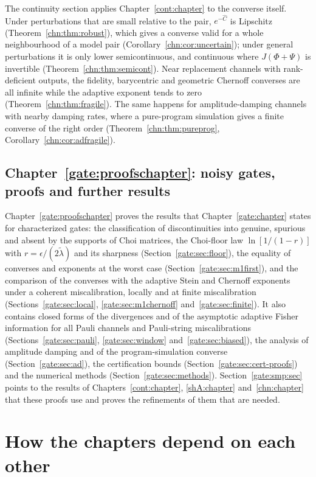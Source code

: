 The continuity section applies Chapter~\ref{cont:chapter} to the converse itself. Under perturbations that are small relative to the pair, $e^{-\widehat C}$ is Lipschitz (Theorem~\ref{chn:thm:robust}), which gives a converse valid for a whole neighbourhood of a model pair (Corollary~\ref{chn:cor:uncertain}); under general perturbations it is only lower semicontinuous, and continuous where $J(\Phi+\Psi)$ is invertible (Theorem~\ref{chn:thm:semicont}). Near replacement channels with rank-deficient outputs, the fidelity, barycentric and geometric Chernoff converses are all infinite while the adaptive exponent tends to zero (Theorem~\ref{chn:thm:fragile}). The same happens for amplitude-damping channels with nearby damping rates, where a pure-program simulation gives a finite converse of the right order (Theorem~\ref{chn:thm:pureprog}, Corollary~\ref{chn:cor:adfragile}).

\subsection*{Chapter~\ref{gate:proofschapter}: noisy gates, proofs and further results}

Chapter~\ref{gate:proofschapter} proves the results that Chapter~\ref{gate:chapter} states for characterized gates: the classification of discontinuities into genuine, spurious and absent by the supports of Choi matrices, the Choi-floor law $\ln[1/(1-r)]$ with $r=\epsilon/(2\tilde\lambda)$ and its sharpness (Section~\ref{gate:sec:floor}), the equality of converses and exponents at the worst case (Section~\ref{gate:sec:m1first}), and the comparison of the converses with the adaptive Stein and Chernoff exponents under a coherent miscalibration, locally and at finite miscalibration (Sections~\ref{gate:sec:local}, \ref{gate:sec:m1chernoff} and~\ref{gate:sec:finite}). It also contains closed forms of the divergences and of the asymptotic adaptive Fisher information for all Pauli channels and Pauli-string miscalibrations (Sections~\ref{gate:sec:pauli}, \ref{gate:sec:window} and~\ref{gate:sec:biased}), the analysis of amplitude damping and of the program-simulation converse (Section~\ref{gate:sec:ad}), the certification bounds (Section~\ref{gate:sec:cert-proofs}) and the numerical methods (Section~\ref{gate:sec:methods}). Section~\ref{gate:smp:sec} points to the results of Chapters~\ref{cont:chapter}, \ref{shA:chapter} and~\ref{chn:chapter} that these proofs use and proves the refinements of them that are needed.

\section{How the chapters depend on each other}\label{ov:sec:dependencies}

